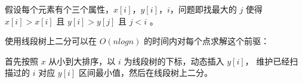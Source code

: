 假设每个元素有个三个属性，$x[i]$，$y[i]$，$i$，问题即找最大的 $j$ 使得 $x[i] > x[i]$  且 $y[i] > y[j]$ 且 $j<i$ 。

使用线段树上二分可以在 $O(nlogn)$ 的时间内对每个点求解这个前驱：

首先按照 $x$ 从小到大排序，以 $i$ 为线段树的下标，动态插入 $y[i]$， 维护已经扫描过的 $i$ 对应 $y[i]$ 区间最小值，然后在线段树上二分。